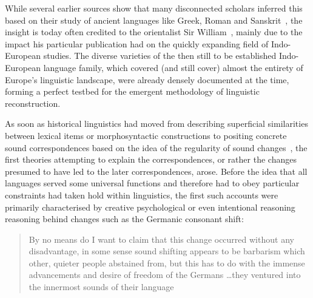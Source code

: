 While several earlier sources show that many disconnected scholars inferred this based on their study of ancient languages like Greek, Roman and Sanskrit~\citep[ch.2]{Jespersen1922},
the insight is today often credited to the orientalist Sir William~\citet{Jones1799}, mainly due to the impact his particular publication had on the quickly expanding field of Indo-European studies. The diverse varieties of the then still to be established Indo-European language family, which covered (and still cover) almost the entirety of Europe's linguistic landscape, were already densely documented at the time, forming a perfect testbed for the emergent methodology of linguistic reconstruction.

As soon as historical linguistics had moved from describing superficial similarities between lexical items or morphosyntactic constructions to positing concrete sound correspondences based on the idea of the regularity of sound changes~\citep{Paul1880}, the first theories attempting to explain the correspondences, or rather the changes presumed to have led to the later correspondences, arose. Before the idea that all languages served some universal functions and therefore had to obey particular constraints had taken hold within linguistics, the first such accounts were primarily characterised by creative psychological or even intentional reasoning reasoning behind changes such as the Germanic consonant shift:


\begin{quote}
By no means do I want to claim that this change occurred without any disadvantage, in some sense sound shifting appears to be barbarism which other, quieter people abstained from, but this has to do with the immense advancements and desire of freedom of the Germans \ldots they ventured into the innermost sounds of their language~\citep[p.417, own translation]{Grimm1848}
\end{quote}

